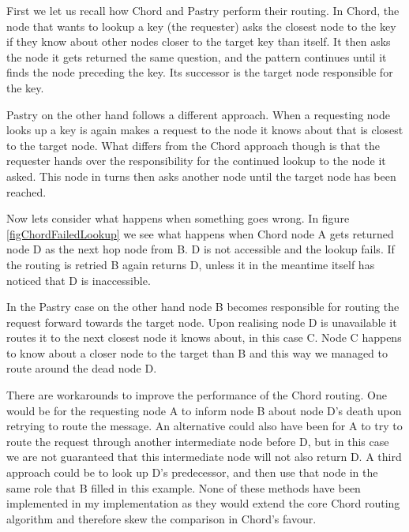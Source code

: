 First we let us recall how Chord and Pastry perform their routing.
In Chord, the node that wants to lookup a key (the requester) asks the closest node to the key if they know about other nodes closer to the target key than itself. It then asks the node it gets returned the same question, and the pattern continues until it finds the node preceding the key. Its successor is the target node responsible for the key.

Pastry on the other hand follows a different approach. When a requesting node looks up a key is again makes a request to the node it knows about that is closest to the target node. What differs from the Chord approach though is that the requester hands over the responsibility for the continued lookup to the node it asked. This node in turns then asks another node until the target node has been reached.

Now lets consider what happens when something goes wrong.
In figure \ref{figChordFailedLookup} we see what happens when Chord node A gets returned node D as the next hop node from B. D is not accessible and the lookup fails. If the routing is retried B again returns D, unless it in the meantime itself has noticed that D is inaccessible.

In the Pastry case on the other hand node B becomes responsible for routing the request forward towards the target node. Upon realising node D is unavailable it routes it to the next closest node it knows about, in this case C. Node C happens to know about a closer node to the target than B and this way we managed to route around the dead node D.

There are workarounds to improve the performance of the Chord routing. One would be for the requesting node A to inform node B about node D's death upon retrying to route the message. An alternative could also have been for A to try to route the request through another intermediate node before D, but in this case we are not guaranteed that this intermediate node will not also return D.
A third approach could be to look up D's predecessor, and then use that node in the same role that B filled in this example. None of these methods have been implemented in my implementation as they would extend the core Chord routing algorithm and therefore skew the comparison in Chord's favour.

